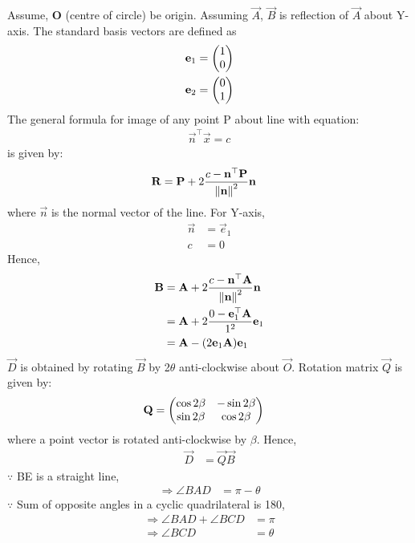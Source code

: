 \documentclass[journal,12pt,twocolumn]{IEEEtran}
\begin{document}
Assume, \textbf{O} (centre of circle) be origin.
Assuming $\vec{A}$, $\vec{B}$ is reflection of $\vec{A}$ about Y-axis.
The standard basis vectors are defined as
\begin{align}
    \mathbf{e}_1 & = \begin{pmatrix}1 \\0\end{pmatrix}\\
    \mathbf{e}_2 & = \begin{pmatrix}0 \\1\end{pmatrix}
\end{align}
The general formula for image of any point P about line with equation:
\begin{align}
    \vec{n}^{\top}\vec{x} = c
\end{align}
is given by:
\begin{align}
    \mathbf{R} & =
    \mathbf{P} + 2\frac{c - \mathbf{n}^{\top}\mathbf{P}}{\left\lVert\mathbf{n}\right\rVert^2}\mathbf{n}
\end{align}
where $\vec{n}$ is the normal vector of the line.
For Y-axis,
\begin{align}
    \vec{n} & = \vec{e}_1 \\
    c       & = 0
\end{align}
Hence,\\
\begin{align}
    \mathbf{B} & =
    \mathbf{A} + 2\frac{c - \mathbf{n}^{\top}\mathbf{A}}{\left\lVert\mathbf{n}\right\rVert^2}\mathbf{n}
    \\
            & =
    \mathbf{A} + 2\frac{0 - \mathbf{e}_1^{\top}\mathbf{A}}{1^2}\mathbf{e}_1
    \\
            & =
    \mathbf{A} - (2\mathbf{e}_1\mathbf{A})\mathbf{e}_1
\end{align}
$\vec{D}$ is obtained by rotating $\vec{B}$ by 2$\theta$ anti-clockwise about $\vec{O}$.
Rotation matrix $\vec{Q}$ is given by:
\begin{align}
    \mathbf{Q} & = \begin{pmatrix}\cos{2\beta} & -\sin{2\beta} \\ \sin{2\beta} & \cos{2\beta}\end{pmatrix}
\end{align}
where a point vector is rotated anti-clockwise by $\beta$.
Hence,
\begin{align}
    \vec{D} & = \vec{Q}\vec{B}
\end{align}
$\because$ BE is a straight line,
\begin{align}
        \Rightarrow \angle{BAD} &= \pi - \theta
\end{align}
$\because$ Sum of opposite angles in a cyclic quadrilateral is 180\textdegree,
\begin{align}
        \Rightarrow \angle{BAD} + \angle{BCD} &= \pi \\
        \Rightarrow \angle{BCD} &= \theta
\end{align}
\end{document}
